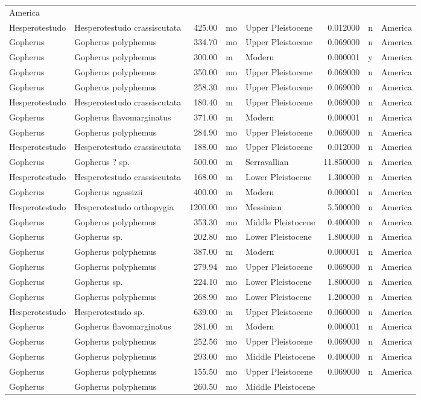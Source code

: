 \begin{landscape}
\begin{longtable}[]{@{}llrllrll@{}}
	America\tabularnewline
	Hesperotestudo & Hesperotestudo crassiscutata & 425.00 & mo & Upper
	Pleistocene & 0.012000 & n & America\tabularnewline
	Gopherus & Gopherus polyphemus & 334.70 & mo & Upper Pleistocene &
	0.069000 & n & America\tabularnewline
	Gopherus & Gopherus polyphemus & 300.00 & m & Modern & 0.000001 & y &
	America\tabularnewline
	Gopherus & Gopherus polyphemus & 350.00 & mo & Upper Pleistocene &
	0.069000 & n & America\tabularnewline
	Gopherus & Gopherus polyphemus & 258.30 & mo & Upper Pleistocene &
	0.069000 & n & America\tabularnewline
	Hesperotestudo & Hesperotestudo crassiscutata & 180.40 & m & Upper
	Pleistocene & 0.069000 & n & America\tabularnewline
	Gopherus & Gopherus flavomarginatus & 371.00 & m & Modern & 0.000001 & n
	& America\tabularnewline
	Gopherus & Gopherus polyphemus & 284.90 & mo & Upper Pleistocene &
	0.069000 & n & America\tabularnewline
	Hesperotestudo & Hesperotestudo crassiscutata & 188.00 & mo & Upper
	Pleistocene & 0.012000 & n & America\tabularnewline
	Gopherus & Gopherus ? sp. & 500.00 & m & Serravallian & 11.850000 & n &
	America\tabularnewline
	Hesperotestudo & Hesperotestudo crassiscutata & 168.00 & m & Lower
	Pleistocene & 1.300000 & n & America\tabularnewline
	Gopherus & Gopherus agassizii & 400.00 & m & Modern & 0.000001 & n &
	America\tabularnewline
	Hesperotestudo & Hesperotestudo orthopygia & 1200.00 & mo & Messinian &
	5.500000 & n & America\tabularnewline
	Gopherus & Gopherus polyphemus & 353.30 & mo & Middle Pleistocene &
	0.400000 & n & America\tabularnewline
	Gopherus & Gopherus sp. & 202.80 & mo & Lower Pleistocene & 1.800000 & n
	& America\tabularnewline
	Gopherus & Gopherus polyphemus & 387.00 & m & Modern & 0.000001 & n &
	America\tabularnewline
	Gopherus & Gopherus polyphemus & 279.94 & mo & Upper Pleistocene &
	0.069000 & n & America\tabularnewline
	Gopherus & Gopherus sp. & 224.10 & mo & Lower Pleistocene & 1.800000 & n
	& America\tabularnewline
	Gopherus & Gopherus polyphemus & 268.90 & mo & Lower Pleistocene &
	1.200000 & n & America\tabularnewline
	Hesperotestudo & Hesperotestudo sp. & 639.00 & m & Upper Pleistocene &
	0.060000 & n & America\tabularnewline
	Gopherus & Gopherus flavomarginatus & 281.00 & m & Modern & 0.000001 & n
	& America\tabularnewline
	Gopherus & Gopherus polyphemus & 252.56 & mo & Upper Pleistocene &
	0.069000 & n & America\tabularnewline
	Gopherus & Gopherus polyphemus & 293.00 & mo & Middle Pleistocene &
	0.400000 & n & America\tabularnewline
	Gopherus & Gopherus polyphemus & 155.50 & mo & Upper Pleistocene &
	0.069000 & n & America\tabularnewline
	Gopherus & Gopherus polyphemus & 260.50 & mo & Middle Pleistocene &

\end{longtable}
\end{landscape}
